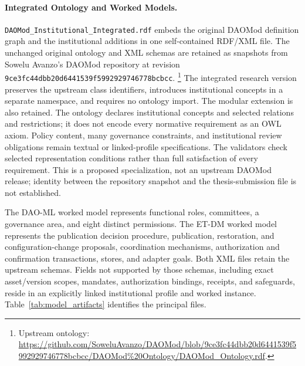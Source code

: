 \documentclass[journal]{IEEEtran}
\begin{document}
\paragraph{Integrated Ontology and Worked Models.}

\texttt{DAOMod\_Institutional\_Integrated.rdf} embeds the original
DAOMod definition graph and the institutional additions in one
self-contained RDF/XML file. The unchanged original ontology
and XML schemas are retained as snapshots from Sowelu Avanzo's
DAOMod repository at revision
\texttt{9ce3fc44dbb20d6441539f5992929746778bcbcc}.
\footnote{Upstream ontology:
\url{https://github.com/SoweluAvanzo/DAOMod/blob/9ce3fc44dbb20d6441539f5992929746778bcbcc/DAOMod\%20Ontology/DAOMod_Ontology.rdf}.}
The integrated research version preserves the upstream class
identifiers, introduces institutional concepts in a separate
namespace, and requires no ontology import. The modular
extension is also retained. The ontology declares institutional
concepts and selected relations and restrictions; it does not
encode every normative requirement as an OWL axiom. Policy
content, many governance constraints, and institutional review
obligations remain textual or linked-profile specifications.
The validators check selected representation conditions rather
than full satisfaction of every requirement. This is a proposed specialization,
not an upstream DAOMod release; identity between the repository
snapshot and the thesis-submission file is not established.

The DAO-ML worked model represents functional roles, committees,
a governance area, and eight distinct permissions. The ET-DM
worked model represents the publication decision procedure,
publication, restoration, and configuration-change proposals,
coordination mechanisms, authorization and confirmation
transactions, stores, and adapter goals. Both XML files retain
the upstream schemas. Fields not supported by those schemas,
including exact asset/version scopes, mandates, authorization
bindings, receipts, and safeguards, reside in an explicitly
linked institutional profile and worked instance.
Table~\ref{tab:model_artifacts} identifies the principal files.
\end{document}
